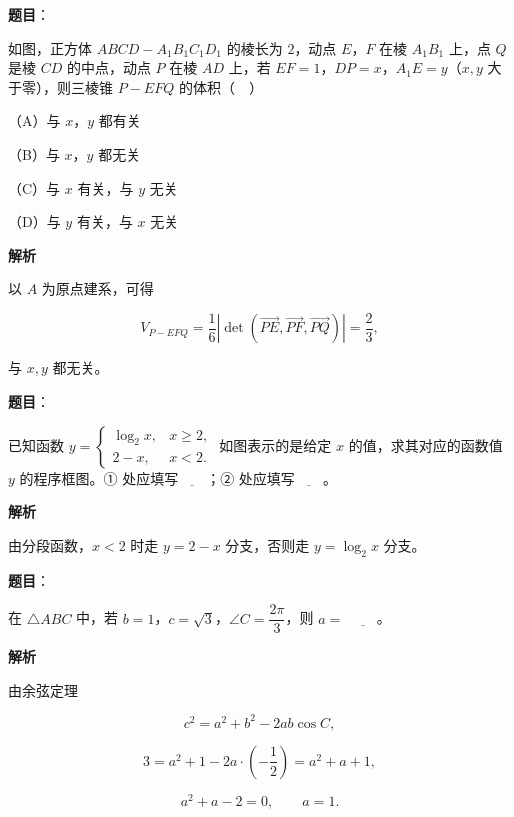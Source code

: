 \begin{answer}

\textbf{题目}：

如图，正方体 $ABCD-A_1B_1C_1D_1$ 的棱长为 $2$，动点 $E$，$F$ 在棱 $A_1B_1$ 上，点 $Q$ 是棱 $CD$ 的中点，动点 $P$ 在棱 $AD$ 上，若 $EF=1$，$DP=x$，$A_1E=y$（$x,y$ 大于零），则三棱锥 $P-EFQ$ 的体积（　）

（A）与 $x$，$y$ 都有关

（B）与 $x$，$y$ 都无关

（C）与 $x$ 有关，与 $y$ 无关

（D）与 $y$ 有关，与 $x$ 无关
\nopagebreak[4]
\begin{center}\end{center}
\nopagebreak[4]
\textbf{解析}

以 $A$ 为原点建系，可得

\nopagebreak[4]
\[V_{P-EFQ}=\frac16\left|\det(\overrightarrow{PE},\overrightarrow{PF},\overrightarrow{PQ})\right|=\frac23,\]

与 $x,y$ 都无关。


\end{answer}
\begin{answer}

\textbf{题目}：

已知函数 $y=\begin{cases}\log_2x,&x\geqslant2,\\ 2-x,&x<2.\end{cases}$ 如图表示的是给定 $x$ 的值，求其对应的函数值 $y$ 的程序框图。① 处应填写$\underline{\qquad}$；② 处应填写$\underline{\qquad}$。
\nopagebreak[4]
\begin{center}\end{center}
\nopagebreak[4]
\textbf{解析}

由分段函数，$x<2$ 时走 $y=2-x$ 分支，否则走 $y=\log_2x$ 分支。


\end{answer}
\begin{answer}

\textbf{题目}：

在 $\triangle ABC$ 中，若 $b=1$，$c=\sqrt3$，$\angle C=\dfrac{2\pi}3$，则 $a=$ $\underline{\qquad}$。

\textbf{解析}

由余弦定理

\nopagebreak[4]
\[c^2=a^2+b^2-2ab\cos C,\]

\nopagebreak[4]
\[3=a^2+1-2a\cdot\left(-\frac12\right)=a^2+a+1,\]

\nopagebreak[4]
\[a^2+a-2=0,\qquad a=1.\]


\end{answer}
